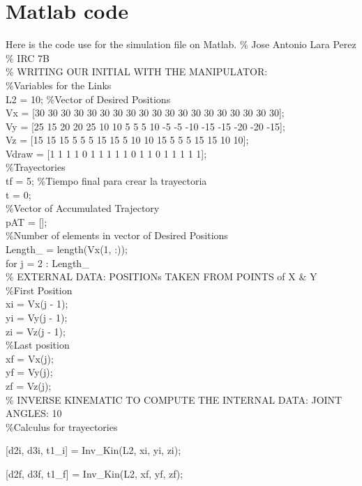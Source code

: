 \documentclass[12pt]{article}
\begin{document}
    \section{Matlab code}
    Here is the code use for the simulation file on Matlab.
\% Jose Antonio Lara Perez\\
\% IRC 7B\\
\% WRITING OUR INITIAL WITH THE MANIPULATOR:\\
\%Variables for the Links
\\L2 = 10;
\%Vector of Desired Positions
\\Vx = [30 30 30 30 30 30 30 30 30 30 30 30 30 30 30 30 30 30 30];
\\Vy = [25 15 20 20 25 10 10 5 5 5 10 -5 -5 -10 -15 -15 -20 -20 -15];
\\Vz = [15 15 15 5 5 5 15 15 5 10 10 15 5 5 5 15 15 10 10];
\\Vdraw = [1 1 1 1 0 1 1 1 1 1 0 1 1 0 1 1 1 1 1];\\
\%Trayectories
\\tf = 5; \%Tiempo final para crear la trayectoria
\\t = 0;\\
\%Vector of Accumulated Trajectory\\
pAT = [];\\
\%Number of elements in vector of Desired Positions
\\Length\_ = length(Vx(1, :));
\\for j = 2 : Length\_\\
\% EXTERNAL DATA: POSITIONs TAKEN FROM POINTS of X \& Y\\
\%First Position
\\xi = Vx(j - 1);
\\yi = Vy(j - 1);
\\zi = Vz(j - 1);\\
\%Last position
\\xf = Vx(j);
\\yf = Vy(j);
\\zf = Vz(j);
\\
\% INVERSE KINEMATIC TO COMPUTE THE INTERNAL DATA: JOINT ANGLES: 10
\\
\%Calculus for trayectories

[d2i, d3i, t1\_i] = Inv\_Kin(L2, xi, yi, zi); %

[d2f, d3f, t1\_f] = Inv\_Kin(L2, xf, yf, zf); %
\end{document}
